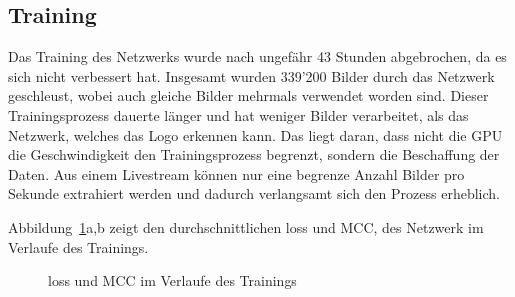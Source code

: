 \documentclass[12pt,a4paper]{report}
\begin{document}
\subsection{Training}
Das Training des Netzwerks wurde nach ungefähr 43 Stunden abgebrochen, da es sich nicht verbessert hat.
Insgesamt wurden 339'200 Bilder durch das Netzwerk geschleust, wobei auch gleiche Bilder mehrmals verwendet worden sind.
Dieser Trainingsprozess dauerte länger und hat weniger Bilder verarbeitet, als das Netzwerk, welches das Logo erkennen kann.
Das liegt daran, dass nicht die GPU die Geschwindigkeit den Trainingsprozess begrenzt, sondern die Beschaffung der Daten.
Aus einem Livestream können nur eine begrenze Anzahl Bilder pro Sekunde extrahiert werden und dadurch verlangsamt sich den Prozess erheblich.

Abbildung~\ref{fig:loss2}a,b zeigt den durchschnittlichen loss und MCC,
des Netzwerk im Verlaufe des Trainings.
\begin{figure}[h]%
    \centering
    \qquad
    \caption{loss und MCC im Verlaufe des Trainings}%
    \label{fig:loss2}%
\end{figure}
\end{document}
